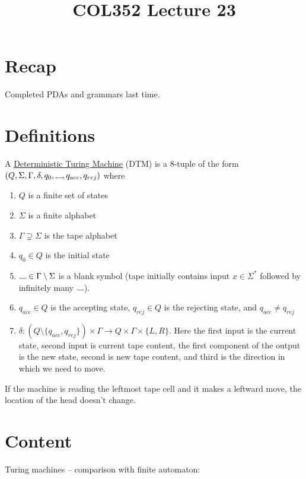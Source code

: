 \documentclass[a4paper]{article}
\title{\textbf{COL352 Lecture 23}}
\date{}
\newcommand\Vtextvisiblespace[1][.3em]{%
  \mbox{\kern.06em\vrule height.3ex}%
  \vbox{\hrule width#1}%
  \hbox{\vrule height.3ex}
}
\newcommand{\blank}{{\Vtextvisiblespace[0.7em]}}
\begin{document}
\maketitle
\tableofcontents

\section{Recap}

Completed PDAs and grammars last time.

\section{Definitions}

\begin{defn}
    A \underline{Deterministic Turing Machine} (DTM) is a 8-tuple of the form $(Q, \Sigma, \Gamma, \delta, q_0, \blank, q_{acc}, q_{rej})$ where
    \begin{enumerate}
        \item $Q$ is a finite set of states
        \item $\Sigma$ is a finite alphabet
        \item $\Gamma \supsetneq \Sigma$ is the tape alphabet
        \item $q_0 \in Q$ is the initial state
        \item $\blank \in \Gamma \setminus \Sigma$ is a blank symbol (tape initially contains input $x \in \Sigma^*$ followed by infinitely many $\blank$).
        \item $q_{acc} \in Q$ is the accepting state, $q_{rej} \in Q$ is the rejecting state, and $q_{acc} \ne q_{rej}$
    \item $\delta : (Q \setminus \{q_{acc}, q_{rej}\}) \times \Gamma \to Q \times \Gamma \times \{L, R\}$.
        Here the first input is the current state, second input is current tape content, the first component of the output is the new state, second is new tape content, and third is the
        direction in which we need to move.
    \end{enumerate}
If the machine is reading the leftmost tape cell and it makes a leftward move, the location of the head doesn't change.
\end{defn}

\section{Content}

Turing machines -- comparison with finite automaton:
\end{document}
